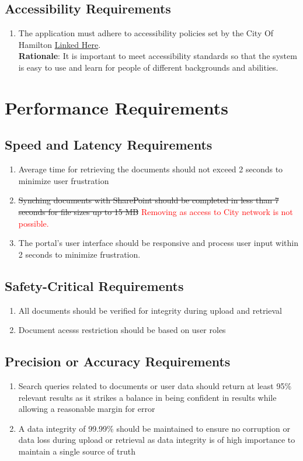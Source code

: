 \documentclass[12pt]{article}
\begin{document}
\subsection{Accessibility Requirements}
\begin{enumerate}[{UH-AS}1.]
  \item The application must adhere to accessibility policies set by the City Of
    Hamilton
    \href{https://www.hamilton.ca/people-programs/inclusion-diversity-equity-accessibility/accessibility-services/accessibility#policies-procedures}{Linked
    Here}.\\
    \textbf{Rationale}: It is important to meet accessibility standards so that
    the system is easy to use and learn for people of different backgrounds and
    abilities.
\end{enumerate}
\section{Performance Requirements}
\subsection{Speed and Latency Requirements}
\begin{enumerate}[{PR-SL}1.]
  \item Average time for retrieving the documents should not exceed 2 seconds to minimize user frustration
  \item \sout{Synching documents with SharePoint should be completed in
    less than 7 seconds for file sizes up to 15 MB}
    \textcolor{red}{Removing as access to City network is not possible.}
  \item The portal's user interface should be responsive and process user input within 2 seconds to minimize frustration.
\end{enumerate}
\subsection{Safety-Critical Requirements}
\begin{enumerate}[{PR-SC}1.]
  \item All documents should be verified for integrity during upload
    and retrieval
  \item Document acesss restriction should be based on user roles
\end{enumerate}
\subsection{Precision or Accuracy Requirements}
\begin{enumerate}[{PR-PA}1.]
  \item Search queries related to documents or user data should
    return at least 95\% relevant results as it strikes a balance in being confident in results 
    while allowing a reasonable margin for error
  \item A data integrity of 99.99\% should be maintained to ensure no
    corruption or data loss during upload or retrieval as data integrity is of high importance to maintain a single source of truth
\end{enumerate}
\end{document}
